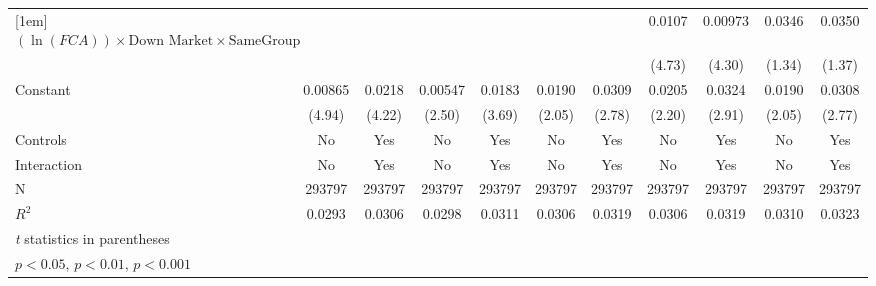 {\begin{tabular}{l*{10}{c}}
[1em]
$ (\ln(FCA)) \times {\text{Down Market} } \times {\text{SameGroup} }  $ &                  &                  &                  &                  &                  &                  &   0.0107\sym{***}&  0.00973\sym{***}&   0.0346         &   0.0350         \\
                &                  &                  &                  &                  &                  &                  &   (4.73)         &   (4.30)         &   (1.34)         &   (1.37)         \\
[1em]
Constant        &  0.00865\sym{***}&   0.0218\sym{***}&  0.00547\sym{*}  &   0.0183\sym{***}&   0.0190\sym{*}  &   0.0309\sym{**} &   0.0205\sym{*}  &   0.0324\sym{**} &   0.0190\sym{*}  &   0.0308\sym{**} \\
                &   (4.94)         &   (4.22)         &   (2.50)         &   (3.69)         &   (2.05)         &   (2.78)         &   (2.20)         &   (2.91)         &   (2.05)         &   (2.77)         \\
\hline
Controls        &       No         &      Yes         &       No         &      Yes         &       No         &      Yes         &       No         &      Yes         &       No         &      Yes         \\
Interaction     &       No         &      Yes         &       No         &      Yes         &       No         &      Yes         &       No         &      Yes         &       No         &      Yes         \\
N               &   293797         &   293797         &   293797         &   293797         &   293797         &   293797         &   293797         &   293797         &   293797         &   293797         \\
$ R^2 $              &   0.0293         &   0.0306         &   0.0298         &   0.0311         &   0.0306         &   0.0319         &   0.0306         &   0.0319         &   0.0310         &   0.0323         \\
\hline\hline
\multicolumn{11}{l}{\footnotesize \textit{t} statistics in parentheses}\\
\multicolumn{11}{l}{\footnotesize \sym{*} \(p<0.05\), \sym{**} \(p<0.01\), \sym{***} \(p<0.001\)}\\
\end{tabular}
}
